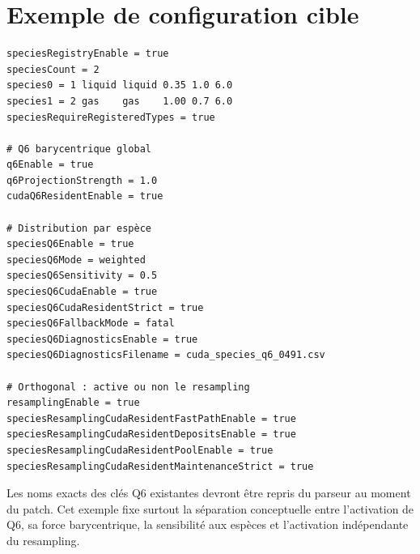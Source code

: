 \documentclass[11pt,a4paper]{article}
\begin{document}
\section{Exemple de configuration cible}

\begin{lstlisting}
speciesRegistryEnable = true
speciesCount = 2
species0 = 1 liquid liquid 0.35 1.0 6.0
species1 = 2 gas    gas    1.00 0.7 6.0
speciesRequireRegisteredTypes = true

# Q6 barycentrique global
q6Enable = true
q6ProjectionStrength = 1.0
cudaQ6ResidentEnable = true

# Distribution par espèce
speciesQ6Enable = true
speciesQ6Mode = weighted
speciesQ6Sensitivity = 0.5
speciesQ6CudaEnable = true
speciesQ6CudaResidentStrict = true
speciesQ6FallbackMode = fatal
speciesQ6DiagnosticsEnable = true
speciesQ6DiagnosticsFilename = cuda_species_q6_0491.csv

# Orthogonal : active ou non le resampling
resamplingEnable = true
speciesResamplingCudaResidentFastPathEnable = true
speciesResamplingCudaResidentDepositsEnable = true
speciesResamplingCudaResidentPoolEnable = true
speciesResamplingCudaResidentMaintenanceStrict = true
\end{lstlisting}

Les noms exacts des clés Q6 existantes devront être repris du parseur au moment du patch. Cet exemple fixe surtout la séparation conceptuelle entre l'activation de Q6, sa force barycentrique, la sensibilité aux espèces et l'activation indépendante du resampling.
\end{document}
